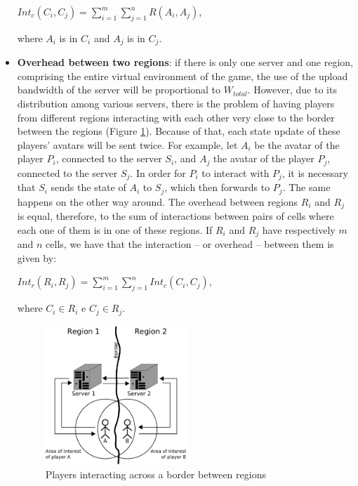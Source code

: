 \begin{itemize}
		\begin{center}
			$\displaystyle Int_c(C_i,C_j) = \sum_{i=1}^{m} \sum_{j=1}^{n} R(A_i,A_j)$,
			
			where $A_i$ is in $C_i$ and $A_j$ is in $C_j$.
		\end{center}
	
	\item \textbf{Overhead between two regions}: if there is only one server and one region, comprising the entire virtual environment of the game, the use of the upload bandwidth of the server will be proportional to $W_{total}$. However, due to its distribution among various servers, there is the problem of having players from different regions interacting with each other very close to the border between the regions (Figure \ref{fig:interactingregions}). Because of that, each state update of these players' avatars will be sent twice. For example, let $A_i$ be the avatar of the player $P_i$, connected to the server $S_i$, and $A_j$ the avatar of the player $P_j$, connected to the server $S_j$. In order for $P_i$ to interact with $P_j$, it is necessary that $S_i$ sends the state of $A_i$ to $S_j$, which then forwards to $P_j$. The same happens on the other way around. The overhead between regions $R_i$ and $R_j$ is equal, therefore, to the sum of interactions between pairs of cells where each one of them is in one of these regions. If $R_i$ and $R_j$ have respectively $m$ and $n$ cells, we have that the interaction -- or overhead -- between them is given by:
	
	  \begin{center}
			$\displaystyle Int_r(R_i,R_j) = \sum_{i=1}^{m} \sum_{j=1}^{n} Int_c(C_i,C_j)$,
			
			where $C_i \in R_i$ e $C_j \in R_j$.
	  \end{center}

	\begin{figure}
	\centering
	\includegraphics[width=0.5\textwidth]{images/interactingregions}
	\caption{Players interacting across a border between regions}
	\label{fig:interactingregions}
	\end{figure}
  	

\end{itemize}
